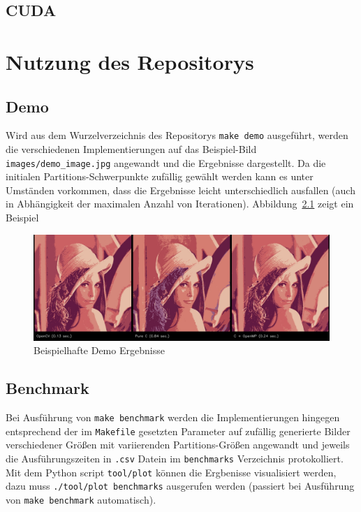 \documentclass[
    bibliography=totoc, cd=lightcolor, cdmath=false, ngerman]{tudscrreprt}
\begin{document}
\section{CUDA}

\chapter{Nutzung des Repositorys}

\section{Demo}

Wird aus dem Wurzelverzeichnis des Repositorys \texttt{make demo} ausgeführt,
werden die verschiedenen Implementierungen auf das Beispiel-Bild
\texttt{images/demo\_image.jpg} angewandt und die Ergebnisse dargestellt. Da
die initialen Partitions-Schwerpunkte zufällig gewählt werden kann es unter
Umständen vorkommen, dass die Ergebnisse leicht unterschiedlich ausfallen
(auch in Abhängigkeit der maximalen Anzahl von Iterationen).
Abbildung~\ref{img:demoresults} zeigt ein Beispiel

\begin{figure}[h]
\centering
\includegraphics[width=\textwidth]{report/resources/demo_results.jpg}
\caption{Beispielhafte Demo Ergebnisse}
\label{img:demoresults}
\end{figure}

\section{Benchmark}

Bei Ausführung von \texttt{make benchmark} werden die Implementierungen
hingegen entsprechend der im \texttt{Makefile} gesetzten Parameter auf zufällig
generierte Bilder verschiedener Größen mit variierenden Partitions-Größen
angewandt und jeweils die Ausführungszeiten in \texttt{.csv} Datein im
\texttt{benchmarks} Verzeichnis protokolliert. Mit dem Python script
\texttt{tool/plot} können die Ergbenisse visualisiert werden, dazu muss
\texttt{./tool/plot benchmarks} ausgerufen werden (passiert bei Ausführung von
\texttt{make benchmark} automatisch).
\end{document}
